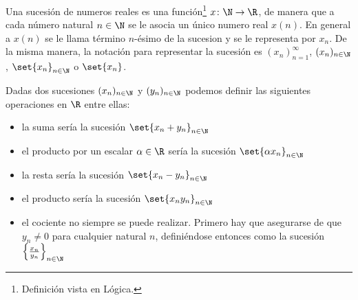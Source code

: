 \begin{definition}
	Una sucesión de numeros reales es una función\footnote{Definición vista en Lógica.} \(x \colon \N \to \R \), de manera que a cada número natural \(n \in \N \) se le asocia un único numero real \(x(n )\). En general a \(x(n )\) se le llama término \(n \)-ésimo de la sucesion y se le representa por \(x_n \). De la misma manera, la notación para representar la sucesión es \((x_n)^{\infty}_{n=1 } \), \((x_n)_{n \in \N }\), \(\set{x_n}_{n \in \N }\) o \(\set{x_n }\).
\end{definition}
\begin{definition}
	Dadas dos sucesiones \((x_n)_{n \in \N }\) y \((y_n)_{n \in \N }\) podemos definir las siguientes operaciones en \(\R \) entre ellas:
	\begin{itemize}
		\item la suma sería la sucesión \(\set{x_n + y_n}_{n \in \N }\)
		\item el producto por un escalar \(\alpha \in \R \) sería la sucesión \(\set{\alpha x_n}_{n \in \N }\)
		\item la resta sería la sucesión \(\set{x_n - y_n}_{n \in \N }\)
		\item el producto sería la sucesión \(\set{x_n y_n}_{n \in \N }\)
		\item el cociente no siempre se puede realizar. Primero hay que asegurarse de que \(y_n \neq 0 \) para cualquier natural \(n \), definiéndose entonces como la sucesión \(\left \{\frac{x_n }{y_n } \right \}_{n \in \N}\)
	\end{itemize}
\end{definition}

